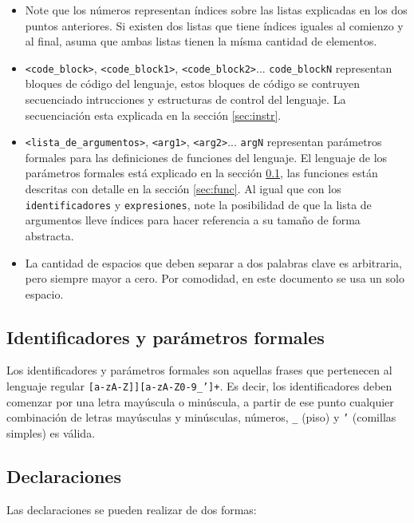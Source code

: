 \documentclass[12pt, spanish]{report}
\begin{document}
\begin{itemize}
\item Note que los números representan índices sobre las listas
  explicadas en los dos puntos anteriores. Si existen dos listas que
  tiene índices iguales al comienzo y al final, asuma que ambas listas
  tienen la mísma cantidad de elementos.
       
\item \texttt{<code\_block>}, \texttt{<code\_block1>},
  \texttt{<code\_block2>}...  \texttt{code\_blockN} representan
  bloques de c\'odigo del lenguaje, estos bloques de c\'odigo se
  contruyen secuenciado intrucciones y estructuras de control del
  lenguaje. La secuenciaci\'on esta explicada en la secci\'on
  \ref{sec:instr}.
       
\item \texttt{<lista\_de\_argumentos>}, \texttt{<arg1>},
  \texttt{<arg2>}...  \texttt{argN} representan par\'ametros formales
  para las definiciones de funciones del lenguaje. El lenguaje de los
  par\'ametros formales est\'a explicado en la secci\'on
  \ref{sec:ident}, las funciones est\'an descritas con detalle en la
  secci\'on \ref{sec:func}. Al igual que con los
  \texttt{identificadores} y \texttt{expresiones}, note la posibilidad
  de que la lista de argumentos lleve índices para hacer referencia a
  su tamaño de forma abstracta.
       
\item La cantidad de espacios que deben separar a dos palabras clave
  es arbitraria, pero siempre mayor a cero. Por comodidad, en este
  documento se usa un solo espacio.
\end{itemize}

\subsection{Identificadores y par\'ametros formales}
\label{sec:ident}
Los identificadores y par\'ametros formales son aquellas frases que
pertenecen al lenguaje regular \texttt{[a-zA-Z]][a-zA-Z0-9\_']+}. Es
decir, los identificadores deben comenzar por una letra may\'uscula o
min\'uscula, a partir de ese punto cualquier combinaci\'on de letras
may\'usculas y min\'usculas, n\'umeros, \texttt{\_} (piso) y
\texttt{'} (comillas simples) es v\'alida.

\subsection{Declaraciones}
\label{sec:decl}

Las declaraciones se pueden realizar de dos formas:\\
\end{document}
